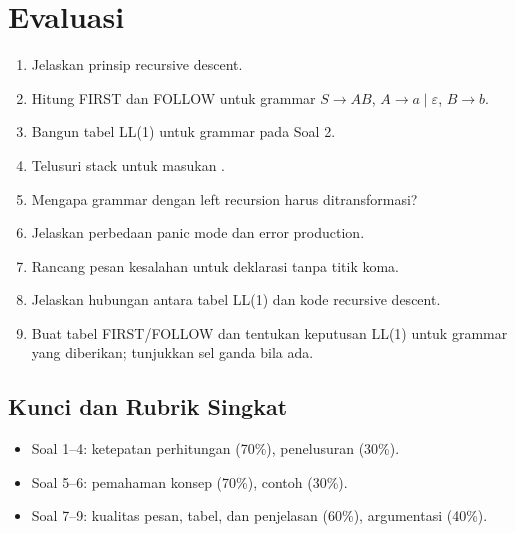 \section*{Evaluasi}

\begin{enumerate}[label=\arabic*.,leftmargin=*]
  \item Jelaskan prinsip recursive descent.
  \item Hitung FIRST dan FOLLOW untuk grammar
        \(S \to A B\), \(A \to a \mid \varepsilon\),
        \(B \to b\).
  \item Bangun tabel LL(1) untuk grammar pada Soal 2.
  \item Telusuri stack untuk masukan .
  \item Mengapa grammar dengan left recursion harus ditransformasi?
  \item Jelaskan perbedaan panic mode dan error production.
  \item Rancang pesan kesalahan untuk deklarasi tanpa titik koma.
  \item Jelaskan hubungan antara tabel LL(1) dan kode recursive
        descent.
  \item Buat tabel FIRST/FOLLOW dan tentukan keputusan LL(1) untuk
        grammar yang diberikan; tunjukkan sel ganda bila ada.
\end{enumerate}

\subsection*{Kunci dan Rubrik Singkat}
\begin{itemize}[leftmargin=*]
  \item Soal 1--4: ketepatan perhitungan (70\%), penelusuran (30\%).
  \item Soal 5--6: pemahaman konsep (70\%), contoh (30\%).
  \item Soal 7--9: kualitas pesan, tabel, dan penjelasan (60\%),
        argumentasi (40\%).
\end{itemize}
